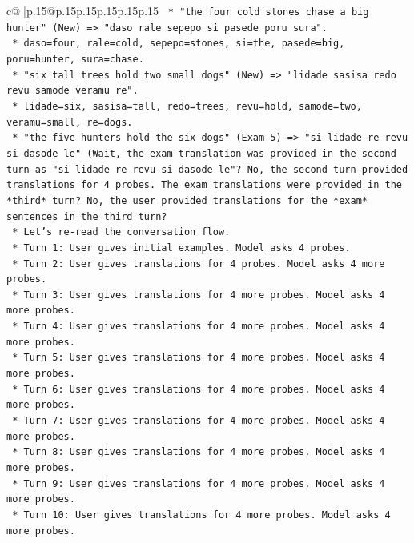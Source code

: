 \documentclass{article}
\begin{document}
{\begin{supertabular}{c@{$\;$}|p{.15\linewidth}@{}p{.15\linewidth}p{.15\linewidth}p{.15\linewidth}p{.15\linewidth}p{.15\linewidth}}
{{{\texttt{                *   "the four cold stones chase a big hunter" (New) => "daso rale sepepo si pasede poru sura".} \\
\texttt{                    *   daso=four, rale=cold, sepepo=stones, si=the, pasede=big, poru=hunter, sura=chase.} \\
\texttt{                *   "six tall trees hold two small dogs" (New) => "lidade sasisa redo revu samode veramu re".} \\
\texttt{                    *   lidade=six, sasisa=tall, redo=trees, revu=hold, samode=two, veramu=small, re=dogs.} \\
\texttt{                *   "the five hunters hold the six dogs" (Exam 5) => "si lidade re revu si dasode le" (Wait, the exam translation was provided in the second turn as "si lidade re revu si dasode le"? No, the second turn provided translations for 4 probes. The exam translations were provided in the *third* turn? No, the user provided translations for the *exam* sentences in the third turn?} \\
\texttt{                *   Let's re{-}read the conversation flow.} \\
\texttt{                    *   Turn 1: User gives initial examples. Model asks 4 probes.} \\
\texttt{                    *   Turn 2: User gives translations for 4 probes. Model asks 4 more probes.} \\
\texttt{                    *   Turn 3: User gives translations for 4 more probes. Model asks 4 more probes.} \\
\texttt{                    *   Turn 4: User gives translations for 4 more probes. Model asks 4 more probes.} \\
\texttt{                    *   Turn 5: User gives translations for 4 more probes. Model asks 4 more probes.} \\
\texttt{                    *   Turn 6: User gives translations for 4 more probes. Model asks 4 more probes.} \\
\texttt{                    *   Turn 7: User gives translations for 4 more probes. Model asks 4 more probes.} \\
\texttt{                    *   Turn 8: User gives translations for 4 more probes. Model asks 4 more probes.} \\
\texttt{                    *   Turn 9: User gives translations for 4 more probes. Model asks 4 more probes.} \\
\texttt{                    *   Turn 10: User gives translations for 4 more probes. Model asks 4 more probes.} \\
}}}
\end{supertabular}}
\end{document}
